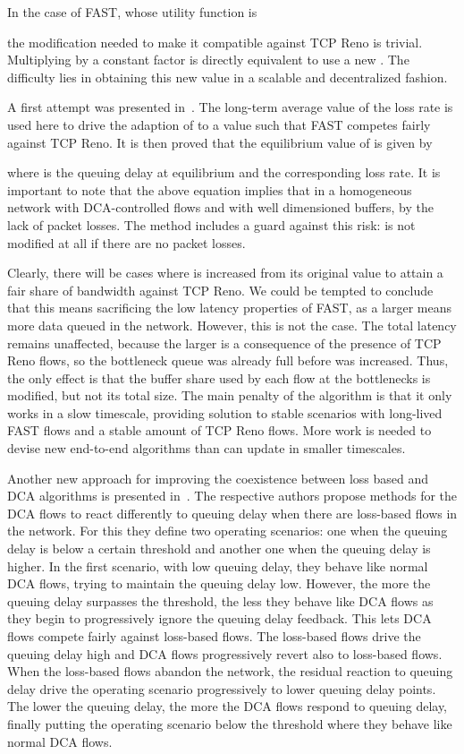 \documentclass[english,times]{ettauth}
\begin{document}
In the case of FAST, whose utility function is

the modification needed to make it compatible against TCP Reno is trivial.
Multiplying  by a constant factor is directly equivalent to use a new
. The difficulty lies in obtaining this new
 value in a scalable and decentralized fashion.

A first attempt was presented in~\cite{Tang06}. The long-term average value of
the loss rate is used here to drive the adaption of  to a value such
that FAST competes fairly against TCP Reno. It is then proved that the
equilibrium value of  is given by

where  is the queuing delay at equilibrium and  the
corresponding loss rate. It is important to note that the above equation
implies that in a homogeneous network with DCA-controlled flows and with well
dimensioned buffers,  by the lack of packet
losses. The method includes a guard against this risk:  is not
modified at all if there are no packet losses.

Clearly, there will be cases where  is increased from its original
value to attain a fair share of bandwidth against TCP Reno. We could be
tempted to conclude that this means sacrificing the low latency properties of
FAST, as a larger  means more data queued in the network. However,
this is not the case. The total latency remains unaffected, because the larger
 is a consequence of the presence of TCP Reno flows, so the bottleneck
queue was already full before  was increased. Thus, the only effect is
that the buffer share used by each flow at the bottlenecks is modified, but
not its total size. The main penalty of the algorithm is that it only works in
a slow timescale, providing solution to stable scenarios with long-lived FAST
flows and a stable amount of TCP Reno flows. More work is needed to devise new
end-to-end algorithms than can update  in smaller timescales.

Another new approach for improving the coexistence between loss based and DCA
algorithms is presented
in~\cite{budzisz09:_strat_fair_coexis_loss_delay,hayes10:_improv_coexis_loss_toler_delay}.
The respective authors propose methods for the DCA flows to react differently
to queuing delay when there are loss-based flows in the network. For this they
define two operating scenarios: one when the queuing delay is below a certain
threshold and another one when the queuing delay is higher. In the first
scenario, with low queuing delay, they behave like normal DCA flows, trying to
maintain the queuing delay low. However, the more the queuing delay surpasses
the threshold, the less they behave like DCA flows as they begin to
progressively ignore the queuing delay feedback. This lets DCA flows compete
fairly against loss-based flows. The loss-based flows drive the queuing delay
high and DCA flows progressively revert also to loss-based flows. When the
loss-based flows abandon the network, the residual reaction to queuing delay
drive the operating scenario progressively to lower queuing delay points. The
lower the queuing delay, the more the DCA flows respond to queuing delay,
finally putting the operating scenario below the threshold where they behave
like normal DCA flows.
\end{document}
